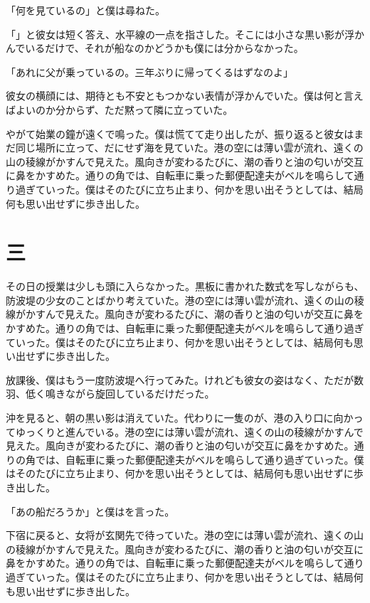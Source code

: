 \documentclass[tate,paper=a5,fontsize=10pt]{jlreq}
\begin{document}
「何を見ているの」と僕は尋ねた。

「」と彼女は短く答え、水平線の一点を指さした。そこには小さな黒い影が浮かんでいるだけで、それが船なのかどうかも僕には分からなかった。

「あれに父が乗っているの。三年ぶりに帰ってくるはずなのよ」

彼女の横顔には、期待とも不安ともつかない表情が浮かんでいた。僕は何と言えばよいのか分からず、ただ黙って隣に立っていた。

やがて始業の鐘が遠くで鳴った。僕は慌てて走り出したが、振り返ると彼女はまだ同じ場所に立って、だにせず海を見ていた。港の空には薄い雲が流れ、遠くの山の稜線がかすんで見えた。風向きが変わるたびに、潮の香りと油の匂いが交互に鼻をかすめた。通りの角では、自転車に乗った郵便配達夫がベルを鳴らして通り過ぎていった。僕はそのたびに立ち止まり、何かを思い出そうとしては、結局何も思い出せずに歩き出した。

\section*{三}
その日の授業は少しも頭に入らなかった。黒板に書かれた数式を写しながらも、防波堤の少女のことばかり考えていた。港の空には薄い雲が流れ、遠くの山の稜線がかすんで見えた。風向きが変わるたびに、潮の香りと油の匂いが交互に鼻をかすめた。通りの角では、自転車に乗った郵便配達夫がベルを鳴らして通り過ぎていった。僕はそのたびに立ち止まり、何かを思い出そうとしては、結局何も思い出せずに歩き出した。

放課後、僕はもう一度防波堤へ行ってみた。けれども彼女の姿はなく、ただが数羽、低く鳴きながら旋回しているだけだった。

沖を見ると、朝の黒い影は消えていた。代わりに一隻のが、港の入り口に向かってゆっくりと進んでいる。港の空には薄い雲が流れ、遠くの山の稜線がかすんで見えた。風向きが変わるたびに、潮の香りと油の匂いが交互に鼻をかすめた。通りの角では、自転車に乗った郵便配達夫がベルを鳴らして通り過ぎていった。僕はそのたびに立ち止まり、何かを思い出そうとしては、結局何も思い出せずに歩き出した。

「あの船だろうか」と僕はを言った。

下宿に戻ると、女将が玄関先で待っていた。港の空には薄い雲が流れ、遠くの山の稜線がかすんで見えた。風向きが変わるたびに、潮の香りと油の匂いが交互に鼻をかすめた。通りの角では、自転車に乗った郵便配達夫がベルを鳴らして通り過ぎていった。僕はそのたびに立ち止まり、何かを思い出そうとしては、結局何も思い出せずに歩き出した。
\end{document}
